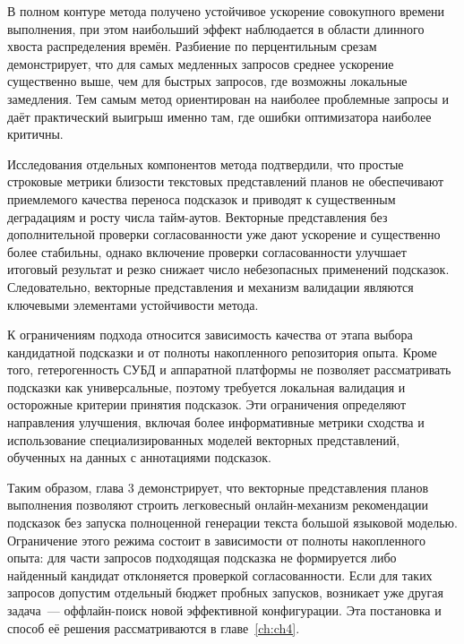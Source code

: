 В полном контуре метода получено устойчивое ускорение совокупного времени выполнения, при этом наибольший эффект наблюдается в области длинного хвоста распределения времён. Разбиение по перцентильным срезам демонстрирует, что для самых медленных запросов среднее ускорение существенно выше, чем для быстрых запросов, где возможны локальные замедления. Тем самым метод ориентирован на наиболее проблемные запросы и даёт практический выигрыш именно там, где ошибки оптимизатора наиболее критичны.

Исследования отдельных компонентов метода подтвердили, что простые строковые метрики близости текстовых представлений планов не обеспечивают приемлемого качества переноса подсказок и приводят к существенным деградациям и росту числа тайм-аутов. Векторные представления без дополнительной проверки согласованности уже дают ускорение и существенно более стабильны, однако включение проверки согласованности улучшает итоговый результат и резко снижает число небезопасных применений подсказок. Следовательно, векторные представления и механизм валидации являются ключевыми элементами устойчивости метода.

К ограничениям подхода относится зависимость качества от этапа выбора кандидатной подсказки и от полноты накопленного репозитория опыта. Кроме того, гетерогенность СУБД и аппаратной платформы не позволяет рассматривать подсказки как универсальные, поэтому требуется локальная валидация и осторожные критерии принятия подсказок. Эти ограничения определяют направления улучшения, включая более информативные метрики сходства и использование специализированных моделей векторных представлений, обученных на данных с аннотациями подсказок.

Таким образом, глава 3 демонстрирует, что векторные представления планов выполнения позволяют строить легковесный онлайн-механизм рекомендации подсказок без запуска полноценной генерации текста большой языковой моделью. Ограничение этого режима состоит в зависимости от полноты накопленного опыта: для части запросов подходящая подсказка не формируется либо найденный кандидат отклоняется проверкой согласованности. Если для таких запросов допустим отдельный бюджет пробных запусков, возникает уже другая задача~--- оффлайн-поиск новой эффективной конфигурации. Эта постановка и способ её решения рассматриваются в главе~\ref{ch:ch4}.

\FloatBarrier
